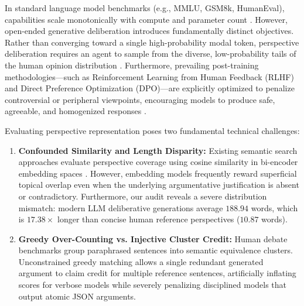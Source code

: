 \documentclass[11pt,a4paper]{article}
\begin{document}
In standard language model benchmarks (e.g., MMLU, GSM8k, HumanEval), capabilities scale monotonically with compute and parameter count \cite{kaplan2020scaling, openai2023gpt4}. However, open-ended generative deliberation introduces fundamentally distinct objectives. Rather than converging toward a single high-probability modal token, perspective deliberation requires an agent to sample from the diverse, low-probability tails of the human opinion distribution \cite{santurkar2023whose}. Furthermore, prevailing post-training methodologies---such as Reinforcement Learning from Human Feedback (RLHF) and Direct Preference Optimization (DPO)---are explicitly optimized to penalize controversial or peripheral viewpoints, encouraging models to produce safe, agreeable, and homogenized responses \cite{sharma2023towards}.

Evaluating perspective representation poses two fundamental technical challenges:
\begin{enumerate}
    \item \textbf{Confounded Similarity and Length Disparity:} Existing semantic search approaches evaluate perspective coverage using cosine similarity in bi-encoder embedding spaces \cite{reimers2019sentence}. However, embedding models frequently reward superficial topical overlap even when the underlying argumentative justification is absent or contradictory. Furthermore, our audit reveals a severe distribution mismatch: modern LLM deliberative generations average $188.94$ words, which is $17.38\times$ longer than concise human reference perspectives ($10.87$ words).
    \item \textbf{Greedy Over-Counting vs. Injective Cluster Credit:} Human debate benchmarks group paraphrased sentences into semantic equivalence clusters. Unconstrained greedy matching allows a single redundant generated argument to claim credit for multiple reference sentences, artificially inflating scores for verbose models while severely penalizing disciplined models that output atomic JSON arguments.
\end{enumerate}
\end{document}
